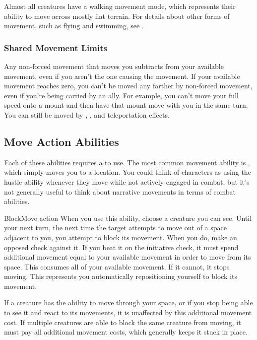     Almost all creatures have a walking movement mode, which represents their ability to move across mostly flat terrain.
    For details about other forms of movement, such as flying and swimming, see .

    \subsubsection{Shared Movement Limits}\label{Shared Movement Limits}
      Any non-forced movement that moves you subtracts from your available movement, even if you aren't the one causing the movement.
      If your available movement reaches zero, you can't be moved any farther by non-forced movement, even if you're being carried by an ally.
      For example, you can't move your full speed onto a mount and then have that mount move with you in the same turn.
      You can still be moved by , , and teleportation effects.

  \subsection{Move Action Abilities}\label{Move Action Abilities}
    Each of these abilities requires a  to use.
    The most common movement ability is , which simply moves you to a location.
    You could think of characters as using the hustle ability whenever they move while not actively engaged in combat, but it's not generally useful to think about narrative movements in terms of combat abilities.

    \begin{activeability}{Block}{Move action}
      \abilitytags \atPhysical
      \rankline
      When you use this ability, choose a creature you can see.
      Until your next turn, the next time the target attempts to move out of a space adjacent to you, you attempt to block its movement.
      When you do, make an opposed  check against it.
      If you beat it on the initiative check, it must spend additional movement equal to your available movement in order to move from its space.
      This consumes all of your available movement.
      If it cannot, it stops moving.
      This represents you automatically repositioning yourself to block its movement.

      If a creature has the ability to move through your space, or if you stop being able to see it and react to its movements, it is unaffected by this additional movement cost.
      If multiple creatures are able to block the same creature from moving, it must pay all additional movement costs, which generally keeps it stuck in place.
    \end{activeability}

